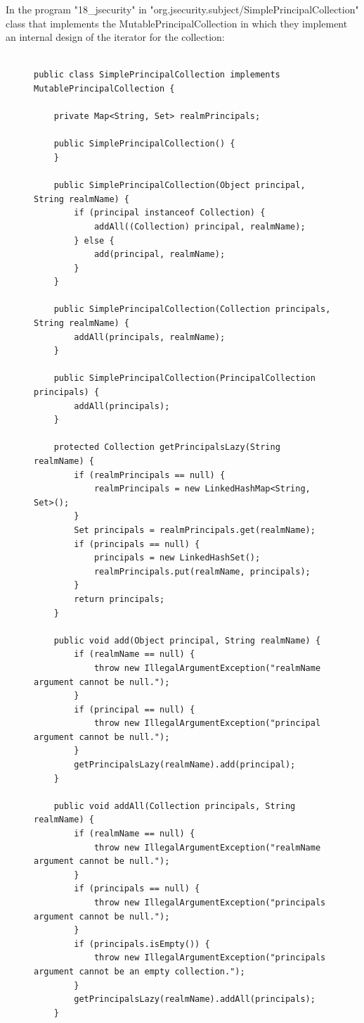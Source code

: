 In the program "18_jsecurity" in "org.jsecurity.subject/SimplePrincipalCollection" class that implements the MutablePrincipalCollection in which they implement an internal design of the iterator for the collection:

\begin{figure}[!tbp]
\centering
\lstset{language=Java, stepnumber=1, showspaces=false, showstringspaces=false,breaklines=true}
\begin{lstlisting}

public class SimplePrincipalCollection implements MutablePrincipalCollection {

    private Map<String, Set> realmPrincipals;

    public SimplePrincipalCollection() {
    }

    public SimplePrincipalCollection(Object principal, String realmName) {
        if (principal instanceof Collection) {
            addAll((Collection) principal, realmName);
        } else {
            add(principal, realmName);
        }
    }

    public SimplePrincipalCollection(Collection principals, String realmName) {
        addAll(principals, realmName);
    }

    public SimplePrincipalCollection(PrincipalCollection principals) {
        addAll(principals);
    }

    protected Collection getPrincipalsLazy(String realmName) {
        if (realmPrincipals == null) {
            realmPrincipals = new LinkedHashMap<String, Set>();
        }
        Set principals = realmPrincipals.get(realmName);
        if (principals == null) {
            principals = new LinkedHashSet();
            realmPrincipals.put(realmName, principals);
        }
        return principals;
    }

    public void add(Object principal, String realmName) {
        if (realmName == null) {
            throw new IllegalArgumentException("realmName argument cannot be null.");
        }
        if (principal == null) {
            throw new IllegalArgumentException("principal argument cannot be null.");
        }
        getPrincipalsLazy(realmName).add(principal);
    }

    public void addAll(Collection principals, String realmName) {
        if (realmName == null) {
            throw new IllegalArgumentException("realmName argument cannot be null.");
        }
        if (principals == null) {
            throw new IllegalArgumentException("principals argument cannot be null.");
        }
        if (principals.isEmpty()) {
            throw new IllegalArgumentException("principals argument cannot be an empty collection.");
        }
        getPrincipalsLazy(realmName).addAll(principals);
    }


\end{lstlisting}
\end{figure}
